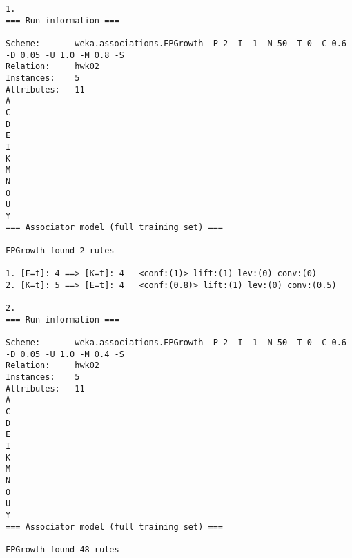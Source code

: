 \documentclass[12pt]{elsart}
\begin{document}
\begin{verbatim}
1.
=== Run information ===

Scheme:       weka.associations.FPGrowth -P 2 -I -1 -N 50 -T 0 -C 0.6 -D 0.05 -U 1.0 -M 0.8 -S
Relation:     hwk02
Instances:    5
Attributes:   11
A
C
D
E
I
K
M
N
O
U
Y
=== Associator model (full training set) ===

FPGrowth found 2 rules

1. [E=t]: 4 ==> [K=t]: 4   <conf:(1)> lift:(1) lev:(0) conv:(0) 
2. [K=t]: 5 ==> [E=t]: 4   <conf:(0.8)> lift:(1) lev:(0) conv:(0.5) 

2.
=== Run information ===

Scheme:       weka.associations.FPGrowth -P 2 -I -1 -N 50 -T 0 -C 0.6 -D 0.05 -U 1.0 -M 0.4 -S
Relation:     hwk02
Instances:    5
Attributes:   11
A
C
D
E
I
K
M
N
O
U
Y
=== Associator model (full training set) ===

FPGrowth found 48 rules


\end{verbatim}
\end{document}
